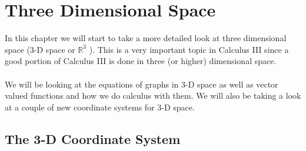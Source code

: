 \documentclass[10pt,reqno]{book}
\theoremstyle{definition}
\def\R{\mathbb{R}}
\begin{document}
	\chapter{Three Dimensional Space}\normalsize
	
	In this chapter we will start to take a more detailed look at three dimensional space (3-D space or $ \R^3 $  ). This is a very important topic in Calculus III since a good portion of Calculus III is done in three (or higher) dimensional space.\\ \\
	We will be looking at the equations of graphs in 3-D space as well as vector valued functions and how we do calculus with them.  We will also be taking a look at a couple of new coordinate systems for 3-D space. 
	
	\section{The 3-D Coordinate System}
	
\end{document}
